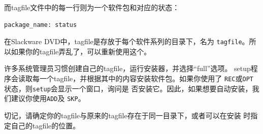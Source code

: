 而tagfile文件中的每一行则为一个软件包和对应的状态：
\begin{Verbatim}[frame=single, commandchars=\\\{\}]
package_name: status
\end{Verbatim}
在Slackware DVD中，tagfile是存放于每个软件系列的目录下，名为
\texttt{tagfile}。所以如果你的tagfile弄乱了，可以重新使用这个。

许多系统管理员习惯创建自己的tagfile，运行安装器，并选择``full''选项。
setup程序会读取每一个tagfile，并根据其中的内容安装软件包。如果你使用了
\texttt{REC}或\texttt{OPT}状态，则\texttt{setup}会显示一个窗口，询问是
否安装它。因此，如果想要自动安装，我们建议你使用\texttt{ADD}及
\texttt{SKP}。

切记，请确定你的tagfile与原来的tagfile存在于同一目录下，或者可以在安装
时指定自己的tagfile的位置。

